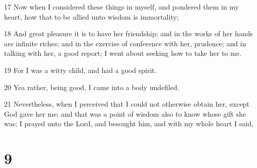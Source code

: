 \par 17 Now when I considered these things in myself, and pondered them in my heart, how that to be allied unto wisdom is immortality;
\par 18 And great pleasure it is to have her friendship; and in the works of her hands are infinite riches; and in the exercise of conference with her, prudence; and in talking with her, a good report; I went about seeking how to take her to me.
\par 19 For I was a witty child, and had a good spirit.
\par 20 Yea rather, being good, I came into a body undefiled.
\par 21 Nevertheless, when I perceived that I could not otherwise obtain her, except God gave her me; and that was a point of wisdom also to know whose gift she was; I prayed unto the Lord, and besought him, and with my whole heart I said,

\chapter{9}

